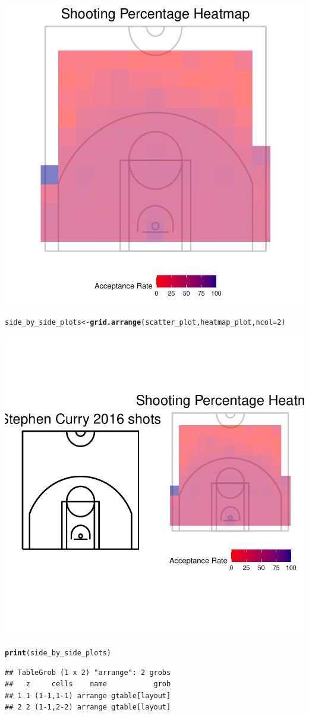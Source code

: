 \documentclass{article}\usepackage[]{graphicx}\usepackage[]{xcolor}
\makeatletter
\newcommand{\hlnum}[1]{\textcolor[rgb]{0.686,0.059,0.569}{#1}}%
\newcommand{\hlstd}[1]{\textcolor[rgb]{0.345,0.345,0.345}{#1}}%
\newcommand{\hlkwb}[1]{\textcolor[rgb]{0.69,0.353,0.396}{#1}}%
\newcommand{\hlkwc}[1]{\textcolor[rgb]{0.333,0.667,0.333}{#1}}%
\newcommand{\hlkwd}[1]{\textcolor[rgb]{0.737,0.353,0.396}{\textbf{#1}}}%
\newenvironment{kframe}{%
 \def\at@end@of@kframe{}%
 \ifinner\ifhmode%
  \def\at@end@of@kframe{\end{minipage}}%
  \begin{minipage}{\columnwidth}%
 \fi\fi%
 \def\FrameCommand##1{\hskip\@totalleftmargin \hskip-\fboxsep
 \colorbox{shadecolor}{##1}\hskip-\fboxsep
     \hskip-\linewidth \hskip-\@totalleftmargin \hskip\columnwidth}%
 \MakeFramed {\advance\hsize-\width
   \@totalleftmargin\z@ \linewidth\hsize
   \@setminipage}}%
 {\par\unskip\endMakeFramed%
 \at@end@of@kframe}
\newenvironment{knitrout}{}{} %
\makeatother
\begin{document}
\begin{knitrout}
{\centering \includegraphics[width=.6\linewidth]{figure/Code-to-submit-Rnwauto-report-5} 

}


\begin{kframe}\begin{alltt}
\hlstd{side_by_side_plots} \hlkwb{<-} \hlkwd{grid.arrange}\hlstd{(scatter_plot, heatmap_plot,} \hlkwc{ncol} \hlstd{=} \hlnum{2}\hlstd{)}
\end{alltt}


{\ttfamily\noindent\color{warningcolor}{\#\# Warning: Removed 132 rows containing missing values or values outside the scale range\\\#\# (`geom\_raster()`).}}\end{kframe}

{\centering \includegraphics[width=.6\linewidth]{figure/Code-to-submit-Rnwauto-report-6} 

}


\begin{kframe}\begin{alltt}
\hlkwd{print}\hlstd{(side_by_side_plots)}
\end{alltt}
\begin{verbatim}
## TableGrob (1 x 2) "arrange": 2 grobs
##   z     cells    name           grob
## 1 1 (1-1,1-1) arrange gtable[layout]
## 2 2 (1-1,2-2) arrange gtable[layout]
\end{verbatim}
\end{kframe}
\end{knitrout}
\end{document}
